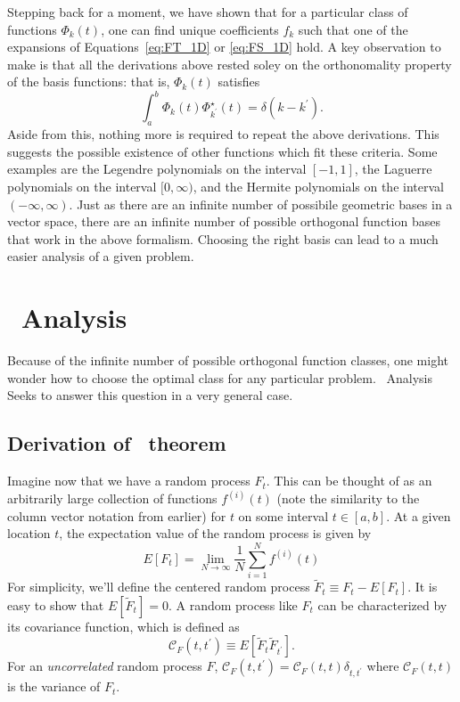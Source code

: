 Stepping back for a moment, we have shown that for a particular
class of functions $\Phi_k(t)$, one can find unique coefficients
$f_k$ such that one of the expansions of
Equations~\ref{eq:FT_1D} or \ref{eq:FS_1D} hold.
A key observation to make is that all the derivations above rested 
soley on the orthonomality property of the basis functions: that is,
$\Phi_k(t)$ satisfies
\begin{equation}
  \int_a^b \Phi_k(t) \Phi^\star_{k^\prime}(t) 
  = \delta(k - k^\prime).
\end{equation}
Aside from this, nothing more is required to repeat the above derivations.
This suggests the possible existence of other functions which fit these
criteria.  Some examples are the Legendre polynomials on the interval
$[-1, 1]$, the Laguerre polynomials on the interval $[0, \infty)$, and
the Hermite polynomials on the interval $(-\infty, \infty)$.
Just as there are an infinite number of possibile geometric
bases in a vector space, there are an infinite number of possible orthogonal
function bases that work in the above formalism.  Choosing the right basis
can lead to a much easier analysis of a given problem.

\section{\KL\ Analysis}
Because of the infinite number of possible orthogonal function classes,
one might wonder how to choose the optimal class for any particular problem.
\KL\ Analysis Seeks to answer this question in a very general case.

\subsection{Derivation of \KL\ theorem}
Imagine now that we have a random process $F_t$.  This can be thought of as
an arbitrarily large collection of functions $f^{(i)}(t)$ (note the similarity
to the column vector notation from earlier) for $t$ on some interval
$t \in [a, b]$.  At a given location $t$, the expectation value of the
random process is given by
\begin{equation}
  E[F_t] = \lim_{N \to \infty} \frac{1}{N} \sum_{i=1}^N f^{(i)}(t)
\end{equation}
For simplicity, we'll define the centered random process
$\tilde{F}_t \equiv F_t - E[F_t]$.  It is easy to show that
$E[\tilde{F}_t] = 0$.  A random process like $F_t$ can be characterized
by its covariance function, which is defined as
\begin{equation}
  \label{eq:corrfunc_def}
  \mathcal{C}_F(t, t^\prime) \equiv E[\tilde{F}_t \tilde{F}_{t^\prime}].
\end{equation}
For an {\it uncorrelated} random process $F$,
$\mathcal{C}_F(t, t^\prime) = \mathcal{C}_F(t, t) \delta_{t, t^\prime}$
where $\mathcal{C}_F(t, t) $ is the variance of $F_t$.

